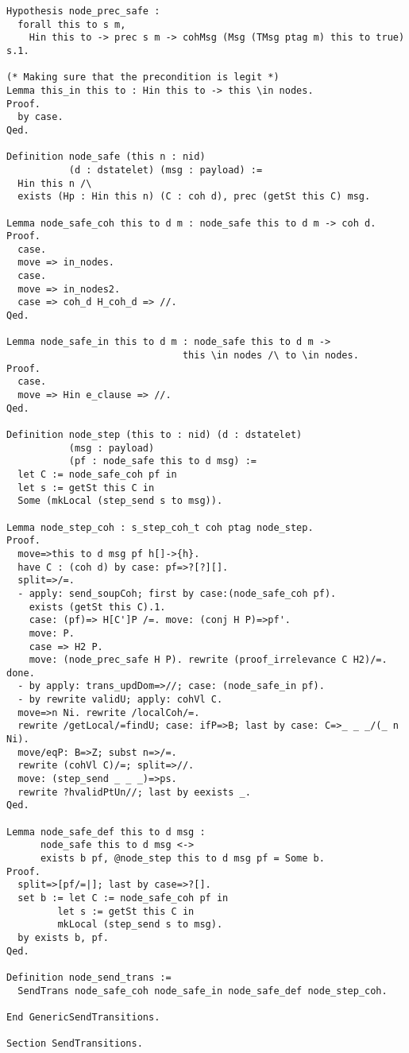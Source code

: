 \begin{landscape}
\begin{multicols*}{2}
\begin{lstlisting}[style=SourceCodeListing]
Hypothesis node_prec_safe :
  forall this to s m,
    Hin this to -> prec s m -> cohMsg (Msg (TMsg ptag m) this to true) s.1.

(* Making sure that the precondition is legit *)
Lemma this_in this to : Hin this to -> this \in nodes.
Proof.
  by case.
Qed.

Definition node_safe (this n : nid)
           (d : dstatelet) (msg : payload) :=
  Hin this n /\
  exists (Hp : Hin this n) (C : coh d), prec (getSt this C) msg.

Lemma node_safe_coh this to d m : node_safe this to d m -> coh d.
Proof.
  case.
  move => in_nodes.
  case.
  move => in_nodes2.
  case => coh_d H_coh_d => //.
Qed.

Lemma node_safe_in this to d m : node_safe this to d m ->
                               this \in nodes /\ to \in nodes.
Proof.
  case.
  move => Hin e_clause => //.
Qed.

Definition node_step (this to : nid) (d : dstatelet)
           (msg : payload)
           (pf : node_safe this to d msg) :=
  let C := node_safe_coh pf in
  let s := getSt this C in
  Some (mkLocal (step_send s to msg)).

Lemma node_step_coh : s_step_coh_t coh ptag node_step.
Proof.
  move=>this to d msg pf h[]->{h}.
  have C : (coh d) by case: pf=>?[?][].
  split=>/=.
  - apply: send_soupCoh; first by case:(node_safe_coh pf).
    exists (getSt this C).1.
    case: (pf)=> H[C']P /=. move: (conj H P)=>pf'.
    move: P.
    case => H2 P.
    move: (node_prec_safe H P). rewrite (proof_irrelevance C H2)/=. done.
  - by apply: trans_updDom=>//; case: (node_safe_in pf).
  - by rewrite validU; apply: cohVl C.
  move=>n Ni. rewrite /localCoh/=.
  rewrite /getLocal/=findU; case: ifP=>B; last by case: C=>_ _ _/(_ n Ni).
  move/eqP: B=>Z; subst n=>/=.
  rewrite (cohVl C)/=; split=>//.
  move: (step_send _ _ _)=>ps.
  rewrite ?hvalidPtUn//; last by eexists _.
Qed.

Lemma node_safe_def this to d msg :
      node_safe this to d msg <->
      exists b pf, @node_step this to d msg pf = Some b.
Proof.
  split=>[pf/=|]; last by case=>?[].
  set b := let C := node_safe_coh pf in
         let s := getSt this C in
         mkLocal (step_send s to msg).
  by exists b, pf.
Qed.

Definition node_send_trans :=
  SendTrans node_safe_coh node_safe_in node_safe_def node_step_coh.

End GenericSendTransitions.

Section SendTransitions.


\end{lstlisting}
\end{multicols*}
\end{landscape}
